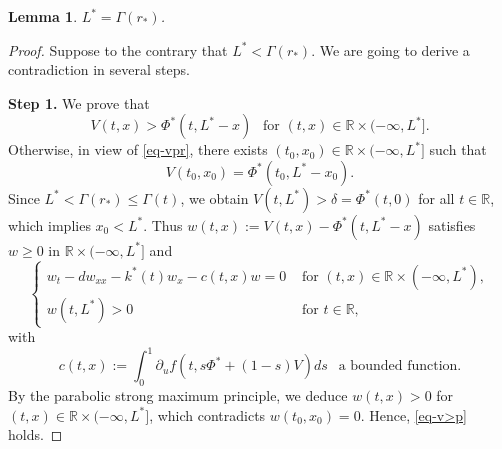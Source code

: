 \documentclass[11pt]{amsart}
\newtheorem{lemma}[theorem]{Lemma}
\numberwithin{equation}{section}
\begin{document}
  \begin{lemma}\label{lemm-gr}
$L^*=\Gamma(r_*)$.
\end{lemma}
\begin{proof}
Suppose to the contrary that $L^*<\Gamma(r_*)$. We are going to derive a contradiction in  several steps.

\textbf{ Step 1.} We prove that 
\begin{equation}\label{eq-v>p}
  V(t,x)> \Phi^*(t,L^*-x) ~~\text{ for } (t,x)\in\mathbb R \times(-\infty,L^*].
\end{equation}
Otherwise, in view of \eqref{eq-vpr}, there exists $(t_0,x_0)\in \mathbb R \times(-\infty,L^*]$ such that
\begin{equation*}
  V(t_0,x_0)= \Phi^*(t_0,L^*-x_0).
\end{equation*}
Since $L^*<\Gamma(r_*)\leq \Gamma(t)$, we obtain $V(t,L^*)>\delta=\Phi^*(t,0)$ for all $t\in\mathbb R$, which implies $x_0<L^*$. Thus $w(t,x):=V(t,x)-\Phi^*(t,L^*-x)$ satisfies $w\geq 0$ in $\mathbb R \times(-\infty,L^*]$ and
\begin{equation*}\begin{cases}
  w_t-dw_{xx}-k^*(t)w_x-c(t,x)w=0 &\text{ for }(t,x)\in\mathbb R \times(-\infty,L^*),\\
  w(t,L^*)> 0 &\text{ for }t\in\mathbb R,
\end{cases}
\end{equation*}
with 
$$c(t,x):=\int_0^1\partial_uf(t,s\Phi^*+(1-s)V)ds\ \  \mbox{ a bounded function.}$$
  By the parabolic strong maximum principle, we deduce  $w(t,x)>0$ for $(t,x)\in\mathbb R \times(-\infty,L^*]$, which contradicts  $w(t_0,x_0)=0$. Hence, \eqref{eq-v>p} holds.


\end{proof}
\end{document}
